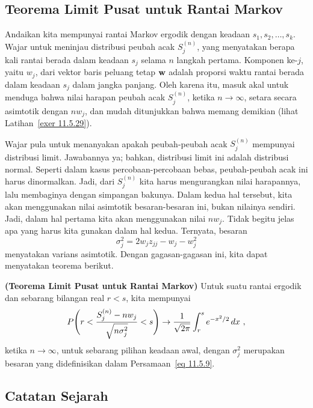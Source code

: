 \subsection*{Teorema Limit Pusat untuk Rantai Markov}
Andaikan kita mempunyai rantai Markov ergodik dengan keadaan $s_1, s_2, \ldots,
s_k$. Wajar untuk meninjau distribusi peubah acak $S^{(n)}_j$, yang menyatakan
berapa kali rantai berada dalam keadaan $s_j$ selama $n$ langkah pertama. Komponen
ke-$j$, yaitu $w_j$, dari vektor baris peluang tetap ${\mbox{\bf w}\/}$ adalah proporsi
waktu rantai berada dalam keadaan $s_j$ dalam jangka panjang. Oleh karena itu,
masuk akal untuk menduga bahwa nilai harapan peubah acak $S^{(n)}_j$, ketika
$n \rightarrow \infty$, setara secara asimtotik dengan $nw_j$, dan mudah ditunjukkan bahwa
memang demikian (lihat Latihan~\ref{exer 11.5.29}).
\par
Wajar pula untuk menanyakan apakah peubah-peubah acak $S^{(n)}_j$ mempunyai
distribusi limit. Jawabannya ya; bahkan, distribusi limit ini adalah distribusi
normal. Seperti dalam kasus percobaan-percobaan bebas, peubah-peubah acak ini
harus dinormalkan. Jadi, dari $S^{(n)}_j$ kita harus mengurangkan nilai harapannya,
lalu membaginya dengan simpangan bakunya. Dalam kedua hal tersebut, kita akan
menggunakan nilai asimtotik besaran-besaran ini, bukan nilainya sendiri. Jadi,
dalam hal pertama kita akan menggunakan nilai $nw_j$. Tidak begitu jelas apa
yang harus kita gunakan dalam hal kedua. Ternyata, besaran
\begin{equation}
\sigma_j^2 = 2w_jz_{jj} - w_j - w_j^2
\label{eq 11.5.9}
\end{equation}
menyatakan varians asimtotik. Dengan gagasan-gagasan ini, kita dapat menyatakan
teorema berikut.
\begin{theorem}\label{thm 11.5.20}{\bf (Teorema Limit Pusat untuk Rantai
Markov)}
Untuk suatu rantai ergodik dan sebarang bilangan real $r < s$, kita mempunyai
$$P\Biggl(r < {{S^{(n)}_j - nw_j}\over{\sqrt{n\sigma_j^2}}}< s\Biggr)
\rightarrow 
{1\over{\sqrt {2\pi}}}\int_r^s e^{-x^2/2}\,dx\
,$$ ketika $n \rightarrow \infty$, untuk sebarang pilihan keadaan awal, dengan
$\sigma_j^2$ merupakan besaran yang didefinisikan dalam
Persamaan~\ref{eq 11.5.9}.
\end{theorem}


\subsection*{Catatan Sejarah}

